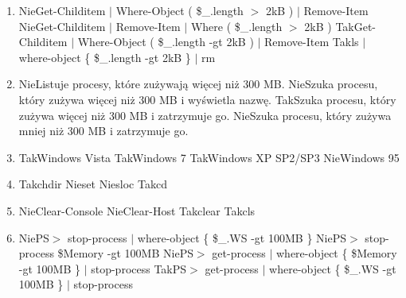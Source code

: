 \begin{enumerate}
		\newpage
		\item {}%
		{Nie}{Get-Childitem $ \mid $  Where-Object ( \$\_.length $>$ 2kB ) $ \mid $ Remove-Item}%
		{Nie}{Get-Childitem $ \mid $ Remove-Item $ \mid $ Where ( \$\_.length $>$ 2kB )}%
		{Tak}{Get-Childitem $ \mid $ Where-Object ( \$\_.length -gt 2kB ) $ \mid $ Remove-Item}%
		{Tak}{ls $ \mid $ where-object \{ \$\_.length -gt 2kB \} $ \mid $ rm}
		\item {}%
		{Nie}{Listuje procesy, które zużywają więcej niż 300 MB.}%
		{Nie}{Szuka procesu, który zużywa więcej niż 300 MB i wyświetla nazwę.}%
		{Tak}{Szuka procesu, który zużywa więcej niż 300 MB i zatrzymuje go.}%
		{Nie}{Szuka procesu, który zużywa mniej niż 300 MB i zatrzymuje go.}
		\item {}%
		{Tak}{Windows Vista}%
		{Tak}{Windows 7}%
		{Tak}{Windows XP SP2/SP3}%
		{Nie}{Windows 95}
		\item {}%
		{Tak}{chdir}%
		{Nie}{set}%
		{Nie}{sloc}%
		{Tak}{cd}
		\item {}%
		{Nie}{Clear-Console}%
		{Nie}{Clear-Host}%
		{Tak}{clear}%
		{Tak}{cls}
		\item {}%
		{Nie}{PS$ > $ stop-process $ \mid $ where-object \{ \$\_.WS -gt 100MB \}}%
		{Nie}{PS$ > $ stop-process \$Memory -gt 100MB}%
		{Nie}{PS$ > $ get-process $ \mid $ where-object \{ \$Memory -gt 100MB \} $ \mid $ stop-process}%
		{Tak}{PS$ > $ get-process $ \mid $ where-object \{ \$\_.WS -gt 100MB \} $ \mid $ stop-process}
		

\end{enumerate}
